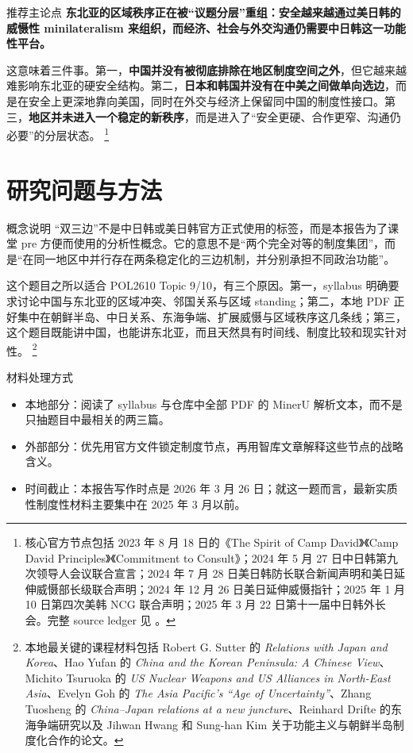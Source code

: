 \documentclass[a4paper]{article}
\begin{document}
\begin{findingbox}{推荐主论点}
\textbf{东北亚的区域秩序正在被“议题分层”重组：安全越来越通过美日韩的威慑性 minilateralism 来组织，而经济、社会与外交沟通仍需要中日韩这一功能性平台。}
\end{findingbox}

这意味着三件事。第一，\textbf{中国并没有被彻底排除在地区制度空间之外}，但它越来越难影响东北亚的硬安全结构。第二，\textbf{日本和韩国并没有在中美之间做单向选边}，而是在安全上更深地靠向美国，同时在外交与经济上保留同中国的制度性接口。第三，\textbf{地区并未进入一个稳定的新秩序}，而是进入了“安全更硬、合作更窄、沟通仍必要”的分层状态。%
\footnote{核心官方节点包括 2023 年 8 月 18 日的《The Spirit of Camp David》《Camp David Principles》《Commitment to Consult》；2024 年 5 月 27 日中日韩第九次领导人会议联合宣言；2024 年 7 月 28 日美日韩防长联合新闻声明和美日延伸威慑部长级联合声明；2024 年 12 月 26 日美日延伸威慑指针；2025 年 1 月 10 日第四次美韩 NCG 联合声明；2025 年 3 月 22 日第十一届中日韩外长会。完整 source ledger 见 。}

\section{研究问题与方法}

\begin{methodbox}{概念说明}
“双三边”不是中日韩或美日韩官方正式使用的标签，而是本报告为了课堂 pre 方便而使用的分析性概念。它的意思不是“两个完全对等的制度集团”，而是“在同一地区中并行存在两条稳定化的三边机制，并分别承担不同政治功能”。
\end{methodbox}

这个题目之所以适合 POL2610 Topic 9/10，有三个原因。第一，syllabus 明确要求讨论中国与东北亚的区域冲突、邻国关系与区域 standing；第二，本地 PDF 正好集中在朝鲜半岛、中日关系、东海争端、扩展威慑与区域秩序这几条线；第三，这个题目既能讲中国，也能讲东北亚，而且天然具有时间线、制度比较和现实针对性。%
\footnote{本地最关键的课程材料包括 Robert G. Sutter 的 \textit{Relations with Japan and Korea}、Hao Yufan 的 \textit{China and the Korean Peninsula: A Chinese View}、Michito Tsuruoka 的 \textit{US Nuclear Weapons and US Alliances in North-East Asia}、Evelyn Goh 的 \textit{The Asia Pacific's “Age of Uncertainty”}、Zhang Tuosheng 的 \textit{China--Japan relations at a new juncture}、Reinhard Drifte 的东海争端研究以及 Jihwan Hwang 和 Sung-han Kim 关于功能主义与朝鲜半岛制度化合作的论文。}

\begin{evidencebox}{材料处理方式}
\begin{itemize}
\item 本地部分：阅读了 syllabus 与仓库中全部 PDF 的 MinerU 解析文本，而不是只抽题目中最相关的两三篇。
\item 外部部分：优先用官方文件锁定制度节点，再用智库文章解释这些节点的战略含义。
\item 时间截止：本报告写作时点是 2026 年 3 月 26 日；就这一题而言，最新实质性制度性材料主要集中在 2025 年 3 月以前。
\end{itemize}
\end{evidencebox}
\end{document}

